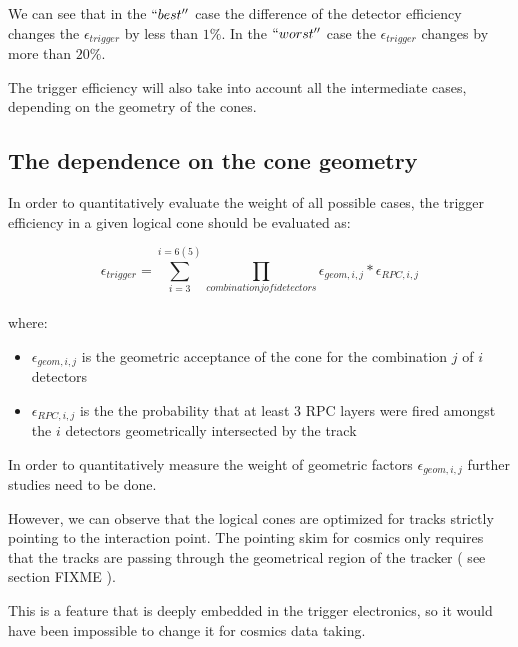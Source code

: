 We can see that in the $ ``best'' $ case the 
difference of the detector efficiency changes the $\epsilon_{trigger}$ 
by less than $1\%$.
In the  $ ``worst''$ case the $\epsilon_{trigger}$ changes by more than $20\%$.


The trigger efficiency will also take into account
all the intermediate cases, depending on the geometry of the cones. 

\subsection{The dependence on the cone geometry}

In order to quantitatively evaluate the weight of all possible cases,
the trigger efficiency in a given logical cone should be evaluated as:

\begin{equation}
\label{efficiency}
\epsilon_{trigger} = \sum_{i=3}^{i=6(5)}\prod_{combination j of i detectors} \epsilon_{geom,i,j} * \epsilon_{RPC,i,j}    
\end{equation} 
\\

where:\\
\begin{itemize}
\item $\epsilon_{geom,i,j}$ is the geometric acceptance of
 the cone for the combination $j$ of $i$ detectors
\item $\epsilon_{RPC,i,j}$ is the the probability that 
at least 3 RPC layers were fired amongst the $i$ detectors
geometrically intersected by the track
\end{itemize}


In order to quantitatively measure the weight of geometric factors
$\epsilon_{geom,i,j}$ further studies need to be done. 



However, we can observe that the logical cones
are optimized for tracks strictly pointing to
the interaction point. The pointing skim 
for  cosmics only requires that the tracks
are passing through the geometrical region of the tracker ( see section FIXME ).

This is a feature that is deeply embedded in the trigger electronics,
so it would have been impossible to change it for cosmics data taking.



